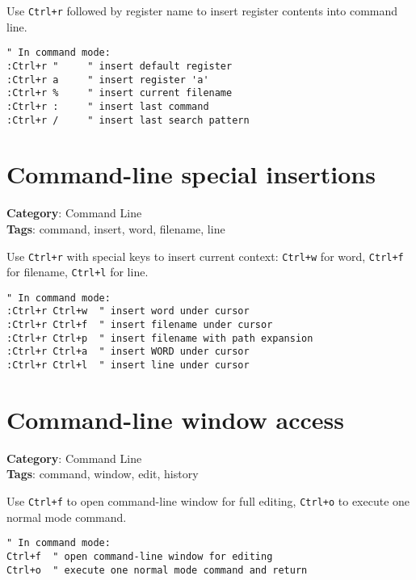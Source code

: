 {{{Use {\footnotesize \Verb§Ctrl+r§} followed by register name to insert register contents into command line.

\begin{Exa*}{}
\begin{Verbatim}[fontsize=\footnotesize, breaklines, breakanywhere]
" In command mode:
:Ctrl+r "     " insert default register
:Ctrl+r a     " insert register 'a'
:Ctrl+r %     " insert current filename
:Ctrl+r :     " insert last command
:Ctrl+r /     " insert last search pattern
\end{Verbatim}
\end{Exa*}

\section{Command-line special insertions}

\textbf{Category}: Command Line\\ \textbf{Tags}: command, insert, word, filename, line
\vspace{0.5cm}

Use {\footnotesize \Verb§Ctrl+r§} with special keys to insert current context: {\footnotesize \Verb§Ctrl+w§} for word, {\footnotesize \Verb§Ctrl+f§} for filename, {\footnotesize \Verb§Ctrl+l§} for line.

\begin{Exa*}{}
\begin{Verbatim}[fontsize=\footnotesize, breaklines, breakanywhere]
" In command mode:
:Ctrl+r Ctrl+w  " insert word under cursor
:Ctrl+r Ctrl+f  " insert filename under cursor
:Ctrl+r Ctrl+p  " insert filename with path expansion
:Ctrl+r Ctrl+a  " insert WORD under cursor
:Ctrl+r Ctrl+l  " insert line under cursor
\end{Verbatim}
\end{Exa*}

\section{Command-line window access}

\textbf{Category}: Command Line\\ \textbf{Tags}: command, window, edit, history
\vspace{0.5cm}

Use {\footnotesize \Verb§Ctrl+f§} to open command-line window for full editing, {\footnotesize \Verb§Ctrl+o§} to execute one normal mode command.

\begin{Exa*}{}
\begin{Verbatim}[fontsize=\footnotesize, breaklines, breakanywhere]
" In command mode:
Ctrl+f  " open command-line window for editing
Ctrl+o  " execute one normal mode command and return
\end{Verbatim}
\end{Exa*}

}}}
